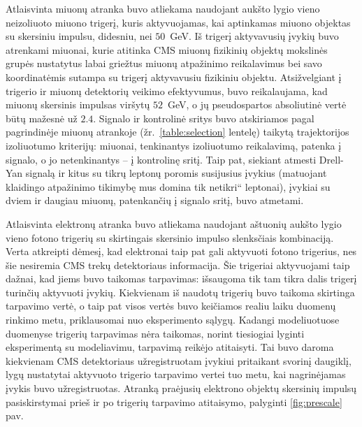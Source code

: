 \documentclass[a4paper, 12pt, oneside]{article}
\newcommand{\ltq}[1]{{\quotedblbase{}#1\textquotedblleft{}}}
\newlength\q
\begin{document}
Atlaisvinta miuonų atranka buvo atliekama naudojant aukšto lygio vieno neizoliuoto miuono trigerį, kuris aktyvuojamas,
kai aptinkamas miuono objektas su skersiniu impulsu, didesniu, nei $50$~GeV.
Iš trigerį aktyvavusių įvykių buvo atrenkami miuonai, kurie atitinka CMS miuonų fizikinių objektų mokslinės grupės nustatytus
labai griežtus miuonų atpažinimo reikalavimus bei savo koordinatėmis sutampa su trigerį aktyvavusiu fizikiniu objektu.
Atsižvelgiant į trigerio ir miuonų detektorių veikimo efektyvumus, buvo reikalaujama, kad miuonų skersinis impulsas viršytų
$52$~GeV, o jų pseudospartos absoliutinė vertė būtų mažesnė už $2.4$.
Signalo ir kontrolinė sritys buvo atskiriamos pagal pagrindinėje miuonų atrankoje (žr.\ \ref{table:selection} lentelę) taikytą
trajektorijos izoliuotumo kriterijų: miuonai, tenkinantys izoliuotumo reikalavimą, patenka į signalo, o jo netenkinantys --
į kontrolinę sritį.
Taip pat, siekiant atmesti Drell-Yan signalą ir kitus su tikrų leptonų poromis susijusius įvykius (matuojant klaidingo
atpažinimo tikimybę mus domina tik \ltq{netikri} leptonai), įvykiai su dviem ir daugiau miuonų, patenkančių į signalo sritį,
buvo atmetami.

Atlaisvinta elektronų atranka buvo atliekama naudojant aštuonių aukšto lygio vieno fotono trigerių su skirtingais skersinio impulso
slenksčiais kombinaciją.
Verta atkreipti dėmesį, kad elektronai taip pat gali aktyvuoti fotono trigerius, nes šie nesiremia CMS trekų detektoriaus informacija.
Šie trigeriai aktyvuojami taip dažnai, kad jiems buvo taikomas tarpavimas: išsaugoma tik tam tikra dalis trigerį turinčių
aktyvuoti įvykių.
Kiekvienam iš naudotų trigerių buvo taikoma skirtinga tarpavimo vertė, o taip pat visos vertės buvo keičiamos realiu laiku duomenų
rinkimo metu, priklausomai nuo eksperimento sąlygų.
Kadangi modeliuotuose duomenyse trigerių tarpavimas nėra taikomas, norint tiesiogiai lyginti eksperimentą su modeliavimu,
tarpavimą reikėjo atitaisyti.
Tai buvo daroma kiekvienam CMS detektoriaus užregistruotam įvykiui pritaikant svorinį daugiklį, lygų nustatytai aktyvuoto
trigerio tarpavimo vertei tuo metu, kai nagrinėjamas įvykis buvo užregistruotas.
Atranką praėjusių elektrono objektų skersinių impulsų pasiskirstymai prieš ir po trigerių tarpavimo atitaisymo, palyginti
\ref{fig:prescale} pav.
\end{document}
